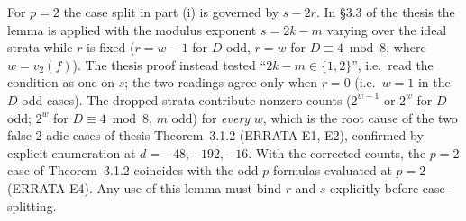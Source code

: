 \begin{remark}\label{lem-3-2-6-e3-warning}
  For $p = 2$ the case split in part (i) is governed by $s - 2r$. In \S 3.3 of
  the thesis the lemma is applied with the modulus exponent $s = 2k - m$ varying
  over the ideal strata while $r$ is fixed ($r = w - 1$ for $D$ odd, $r = w$
  for $D \equiv 4 \bmod 8$, where $w = v_2(f)$). The thesis proof instead tested
  ``$2k - m \in \{1, 2\}$'', i.e.\ read the condition as one on $s$; the two
  readings agree only when $r = 0$ (i.e.\ $w = 1$ in the $D$-odd cases). The
  dropped strata contribute nonzero counts ($2^{w-1}$ or $2^{w}$ for $D$ odd;
  $2^{w}$ for $D \equiv 4 \bmod 8$, $m$ odd) for \emph{every} $w$, which is the
  root cause of the two false 2-adic cases of thesis Theorem~3.1.2
  (ERRATA E1, E2), confirmed by explicit enumeration at $d = -48, -192, -16$.
  With the corrected counts, the $p = 2$ case of Theorem~3.1.2 coincides with
  the odd-$p$ formulas evaluated at $p = 2$ (ERRATA E4). Any use of this lemma
  must bind $r$ and $s$ explicitly before case-splitting.
\end{remark}
